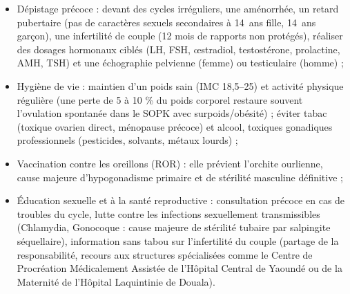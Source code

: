\documentclass[11pt]{article}
\newcommand{\cle}[1]{{\popxbold\color{popdark}#1}}
\newcounter{popsec}
\newcounter{popsub}
\newcommand{\courssub}[1]{%
  \stepcounter{popsub}%
  \par\vspace{9pt}\noindent{\popxbold\fontsize{11.5}{13}\selectfont\color{popink}{\color{poporange}\thepopsec.\thepopsub}\hspace{6pt}#1}\par\nopagebreak\vspace{4pt}
}
\begin{document}
\courssub{Prévention}

\begin{itemize}
\item \cle{Dépistage précoce} : devant des cycles irréguliers, une aménorrhée, un retard pubertaire (pas de caractères sexuels secondaires à \SI{14}{ans} fille, \SI{14}{ans} garçon), une infertilité de couple (12 mois de rapports non protégés), réaliser des dosages hormonaux ciblés (LH, FSH, œstradiol, testostérone, prolactine, AMH, TSH) et une échographie pelvienne (femme) ou testiculaire (homme) ;
\item \cle{Hygiène de vie} : maintien d'un poids sain (IMC 18,5--25) et activité physique régulière (une perte de 5 à 10 \% du poids corporel restaure souvent l'ovulation spontanée dans le SOPK avec surpoids/obésité) ; éviter tabac (toxique ovarien direct, ménopause précoce) et alcool, toxiques gonadiques professionnels (pesticides, solvants, métaux lourds) ;
\item \cle{Vaccination contre les oreillons} (ROR) : elle prévient l'orchite ourlienne, cause majeure d'hypogonadisme primaire et de stérilité masculine définitive ;
\item \cle{Éducation sexuelle et à la santé reproductive} : consultation précoce en cas de troubles du cycle, lutte contre les infections sexuellement transmissibles (Chlamydia, Gonocoque : cause majeure de stérilité tubaire par salpingite séquellaire), information sans tabou sur l'infertilité du couple (partage de la responsabilité, recours aux structures spécialisées comme le Centre de Procréation Médicalement Assistée de l'Hôpital Central de Yaoundé ou de la Maternité de l'Hôpital Laquintinie de Douala).
\end{itemize}
\end{document}
